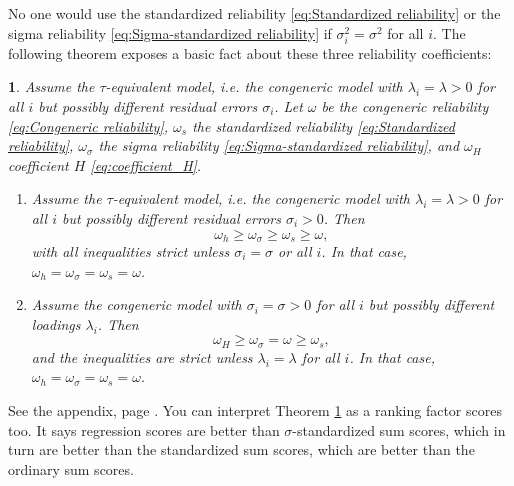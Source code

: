 \documentclass{article}
\makeatletter
\theoremstyle{plain}
\newtheorem{thm}{\protect\theoremname}
\theoremstyle{plain}
\theoremstyle{definition}
\theoremstyle{remark}
\theoremstyle{definition}
\theoremstyle{plain}
\theoremstyle{plain}
\theoremstyle{definition}
\newenvironment{proof}[1][\protect\proofname]{\par
	\normalfont\topsep6\p@\@plus6\p@\relax
	\trivlist
	\itemindent\parindent
	\item[\hskip\labelsep\scshape #1]\ignorespaces
}{%
	\endtrivlist\@endpefalse
}
\providecommand{\proofname}{Proof}
\providecommand{\theoremname}{Theorem}
\makeatother
\begin{document}
No one would use the standardized reliability \eqref{eq:Standardized reliability}
or the sigma reliability \eqref{eq:Sigma-standardized reliability}
if $\sigma_{i}^{2}=\sigma^{2}$ for all $i$. The following theorem
exposes a basic fact about these three reliability coefficients:
\begin{thm}
\label{thm:Properties of three} Assume the $\tau$-equivalent model,
i.e. the congeneric model with $\lambda_{i}=\lambda>0$ for all $i$
but possibly different residual errors $\sigma_{i}$. Let $\omega$ be the congeneric
reliability \eqref{eq:Congeneric reliability}, $\omega_{s}$ the standardized reliability \eqref{eq:Standardized reliability},
$\omega_{\sigma}$ the sigma reliability \eqref{eq:Sigma-standardized reliability},
and $\omega_{H}$ coefficient $H$ \eqref{eq:coefficient_H}. 

\begin{enumerate}[label=(\roman*)]
\item Assume the $\tau$-equivalent model,
i.e. the congeneric model with $\lambda_{i}=\lambda>0$ for all $i$
but possibly different residual errors $\sigma_{i}>0$. Then
\[
\omega_{h}\geq\omega_{\sigma}\geq\omega_{s}\geq\omega,
\]
with all inequalities strict unless $\sigma_{i}=\sigma$ or all
$i$. In that case, $\omega_{h} = \omega_{\sigma} = \omega_{s} = \omega$.
\item Assume the congeneric model with $\sigma_i = \sigma > 0$ for all $i$ but possibly different loadings $\lambda_i$. Then
\[
\omega_{H}\geq\omega_{\sigma}=\omega\geq\omega_{s},
\]
and the inequalities are strict unless $\lambda_{i}=\lambda$ for all
$i$. In that case, $\omega_{h} = \omega_{\sigma} = \omega_{s} = \omega$.

\end{enumerate}

\end{thm}
\begin{proof}
See the appendix, page \pageref{proof:Properties}.
\end{proof}
You can interpret Theorem \ref{thm:Properties of three} as a ranking factor scores too. It says
regression scores are better than $\sigma$-standardized sum scores,
which in turn are better than the standardized sum scores, which are
better than the ordinary sum scores.

\end{document}
